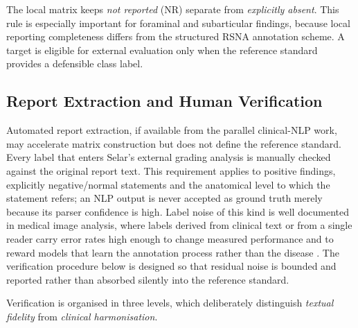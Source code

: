 The local matrix keeps \emph{not reported} (NR) separate from \emph{explicitly
absent}. This rule is especially important for foraminal and subarticular
findings, because local reporting completeness differs from the structured RSNA
annotation scheme. A target is eligible for external evaluation only when the
reference standard provides a defensible class label.

\subsection{Report Extraction and Human Verification}
\label{sec:method-report-verification}

Automated report extraction, if available from the parallel clinical-NLP work,
may accelerate matrix construction but does not define the reference standard.
Every label that enters Selar's external grading analysis is manually checked
against the original report text. This requirement applies to positive findings,
explicitly negative/normal statements and the anatomical level to which the
statement refers; an NLP output is never accepted as ground truth merely because
its parser confidence is high. Label noise of this kind is well documented in
medical image analysis, where labels derived from clinical text or from a single
reader carry error rates high enough to change measured performance and to
reward models that learn the annotation process rather than the disease
\cite{karimi2020deep}. The verification procedure below is designed so that
residual noise is bounded and reported rather than absorbed silently into the
reference standard.

Verification is organised in three levels, which deliberately distinguish
\emph{textual fidelity} from \emph{clinical harmonisation}.

